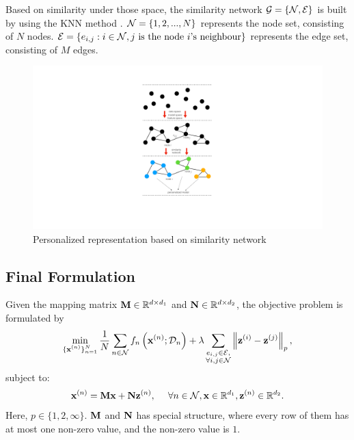 \documentclass[journal]{IEEEtran}
\begin{document}
Based on similarity under those space, the similarity network ${\mathcal{G}} = \{{\mathcal{N}}, {\mathcal{E}}\}$ is built by using the KNN method \cite{dd}. ${\mathcal{N}}=\{1,2, ..., N\}$ represents the node set, consisting of $N$ nodes. ${\mathcal{E}}=\{e_{i,j} : i\in{\mathcal{N}}, j {~} \text{is the node $i$'s neighbour}\}$ represents the edge set, consisting of $M$ edges. 

\begin{figure}[!t]
\setlength{\abovecaptionskip}{0pt}
\setlength{\belowcaptionskip}{0pt}
\centering 
\includegraphics[width=0.97\columnwidth]{figs/figs_networkG}
\caption{Personalized representation based on similarity network}
\label{figure_xxx}
\end{figure}



\subsection{Final Formulation}
Given the mapping matrix ${\bf M}\in\mathbb{R}^{d\times d_1}$ and ${\bf N}\in\mathbb{R}^{d\times d_2}$, the objective problem is formulated by
\begin{align}
\nonumber
\min_{\substack{\{{\bf x}^{(n)}\}_{n=1}^N}} \frac{1}{N}\sum_{n\in{\mathcal{N}}} f_n\left( {\bf x}^{(n)}; \mathcal{D}_n \right) + \lambda \sum_{\substack{e_{i,j} \in {\mathcal{E}},\\ \forall i,j\in{\mathcal{N}}}} \left\lVert{\bf z}^{(i)} - {\bf z}^{(j)}\right\rVert_p,
\end{align} subject to:
\begin{align}
\nonumber
{\bf x}^{(n)} = {\bf M}{\bf x} + {\bf N} {\bf z}^{(n)},{~~~~}\forall n\in{\mathcal{N}}, {\bf x}\in\mathbb{R}^{d_1}, {\bf z}^{(n)}\in\mathbb{R}^{d_2}.
\end{align} Here, $p\in\{1,2,\infty\}$. ${\bf M}$ and ${\bf N}$ has special structure, where every row of them has at most one non-zero value, and the non-zero value is $1$.  
\end{document}
